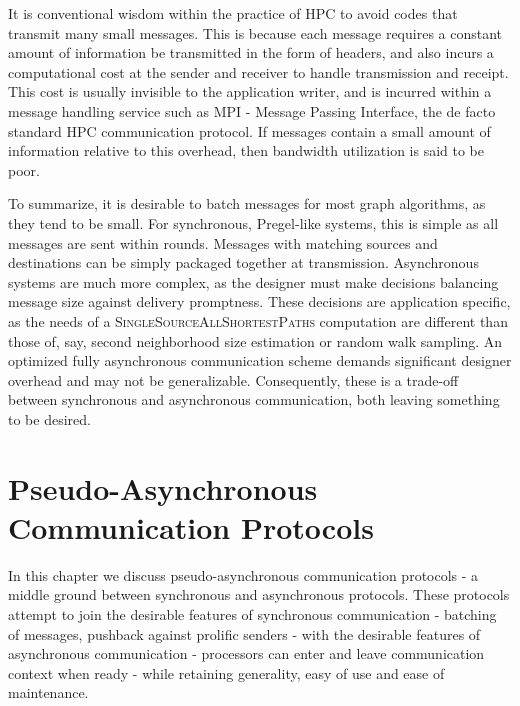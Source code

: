 \documentclass{report}
\newcommand{\algoname}[1]{\textnormal{\textsc{#1}}}
\begin{document}
It is conventional wisdom within the practice of HPC to avoid codes that transmit many small messages.
This is because each message requires a constant amount of information be transmitted in the form of headers, and also incurs a computational cost at the sender and receiver to handle transmission and receipt.
This cost is usually invisible to the application writer, and is incurred within a message handling service such as MPI - Message Passing Interface, the de facto standard HPC communication protocol.
If messages contain a small amount of information relative to this overhead, then bandwidth utilization is said to be poor.

To summarize, it is desirable to batch messages for most graph algorithms, as they tend to be small. 
For synchronous, Pregel-like systems,  this is simple as all messages are sent within rounds. 
Messages with matching sources and destinations can be simply packaged together at transmission.
Asynchronous systems are much more complex, as the designer must make decisions balancing message size against delivery promptness.
These decisions are application specific, as the needs of a \algoname{SingleSourceAllShortestPaths} computation are different than those of, say, second neighborhood size estimation or random walk sampling. 
An optimized fully asynchronous communication scheme demands significant designer overhead and may not be generalizable.
Consequently, these is a trade-off between synchronous and asynchronous communication, both leaving something to be desired.  





\section{Pseudo-Asynchronous Communication Protocols} \label{async:sec:async}

In this chapter we discuss pseudo-asynchronous communication protocols - a middle ground between synchronous and asynchronous protocols.
These protocols attempt to join the desirable features of synchronous communication - batching of messages, pushback against prolific senders - with the desirable features of asynchronous communication - processors can enter and leave communication context when ready - while retaining generality, easy of use and ease of maintenance. 
\end{document}
